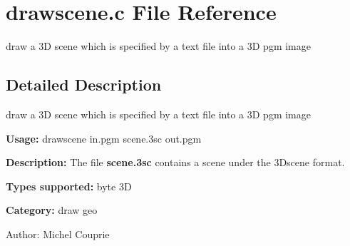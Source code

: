 \section{drawscene.c File Reference}
\label{drawscene_8c}
draw a 3D scene which is specified by a text file into a 3D pgm image  




\label{_details}
\subsection{Detailed Description}
draw a 3D scene which is specified by a text file into a 3D pgm image 

{\bf Usage:} drawscene in.pgm scene.3sc out.pgm

{\bf Description:} The file {\bf scene.3sc} contains a scene under the 3Dscene format.

{\bf Types supported:} byte 3D

{\bf Category:} draw geo

\begin{Desc}
\item[Author:]Michel Couprie \end{Desc}
